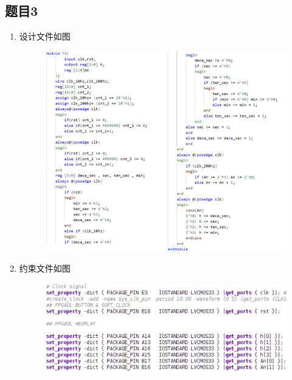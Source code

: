 \documentclass{article}
\begin{document}
    \subsection*{题目3}
    \begin{enumerate}
        \item []设计文件如图
        \begin{figure}[htbp]
            \centering
            \includegraphics[scale=0.7]{v3.png}
        \end{figure}

        \item []约束文件如图
        \begin{figure}[htbp]
            \centering
            \includegraphics[scale=0.8]{x3.png}
        \end{figure}


\end{enumerate}
\end{document}
